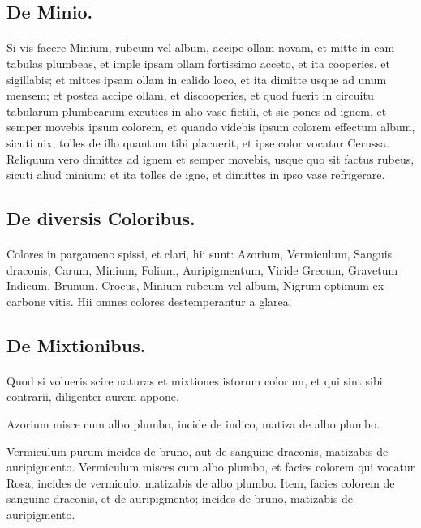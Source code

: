 \documentclass[a4paper, 11pt, oneside, polutonikogreek, italian]{article}
\begin{document}
\subsection{De Minio.}
\paragraph{}
Si vis facere Minium, rubeum vel album, accipe ollam novam, et mitte in eam tabulas plumbeas, et imple ipsam ollam fortissimo acceto, et ita cooperies, et sigillabis; et mittes ipsam ollam in calido loco, et ita dimitte usque ad unum mensem; et postea accipe ollam, et discooperies, et quod fuerit in circuitu tabularum plumbearum excuties in alio vase fictili, et sic pones ad ignem, et semper movebis ipsum colorem, et quando videbis ipsum colorem effectum album, sicuti nix, tolles de illo quantum tibi placuerit, et ipse color vocatur Cerussa. Reliquum vero dimittes ad ignem et semper movebis, usque quo sit factus rubeus, sicuti aliud minium; et ita tolles de igne, et dimittes in ipso vase refrigerare.

\subsection{De diversis Coloribus.}
\paragraph{}
Colores in pargameno spissi, et clari, hii sunt: Azorium, Vermiculum, Sanguis draconis, Carum, Minium, Folium, Auripigmentum, Viride Grecum, Gravetum Indicum, Brunum, Crocus, Minium rubeum vel album, Nigrum optimum ex carbone vitis. Hii omnes colores destemperantur a glarea.

\subsection{De Mixtionibus.}
\paragraph{}
Quod si volueris scire naturas et mixtiones istorum colorum, et qui sint sibi contrarii, diligenter aurem appone.

Azorium misce cum albo plumbo, incide de indico, matiza de albo plumbo.

Vermiculum purum incides de bruno, aut de sanguine draconis, matizabis de auripigmento. Vermiculum misces cum albo plumbo, et facies colorem qui vocatur Rosa; incides de vermiculo, matizabis de albo plumbo. Item, facies colorem de sanguine draconis, et de auripigmento; incides de bruno, matizabis de auripigmento.
\end{document}
